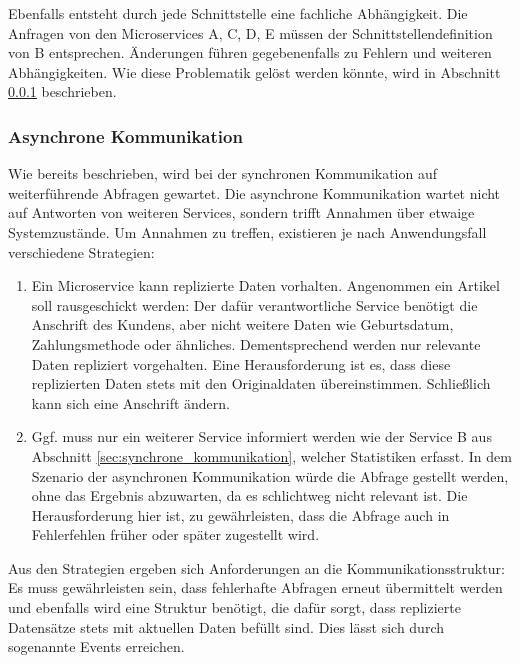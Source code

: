 Ebenfalls entsteht durch jede Schnittstelle eine fachliche Abhängigkeit.\cite{bruce2019mic_in_action} Die Anfragen von den Microservices A, C, D, E müssen der Schnittstellendefinition von B entsprechen. Änderungen führen gegebenenfalls zu Fehlern und weiteren Abhängigkeiten. Wie diese Problematik gelöst werden könnte, wird in Abschnitt \ref{sec:asynchrone_kommunikation} beschrieben.

\subsubsection{Asynchrone Kommunikation}\label{sec:asynchrone_kommunikation}

Wie bereits beschrieben, wird bei der synchronen Kommunikation auf weiterführende Abfragen gewartet. Die asynchrone Kommunikation wartet nicht auf Antworten von weiteren Services, sondern trifft Annahmen über etwaige Systemzustände.\cite{wolff2018mic_praxis} Um Annahmen zu treffen, existieren je nach Anwendungsfall verschiedene Strategien:

\begin{enumerate}
\item{ Ein Microservice kann replizierte Daten vorhalten. Angenommen ein Artikel soll rausgeschickt werden: Der dafür verantwortliche Service benötigt die Anschrift des Kundens, aber nicht weitere Daten wie Geburtsdatum, Zahlungsmethode oder ähnliches. Dementsprechend werden nur relevante Daten repliziert vorgehalten. Eine Herausforderung ist es, dass diese replizierten Daten stets mit den Originaldaten übereinstimmen. Schließlich kann sich eine Anschrift ändern.\cite{wolff2018mic_praxis}}

\item{Ggf. muss nur ein weiterer Service informiert werden wie der Service B aus Abschnitt \ref{sec:synchrone_kommunikation}, welcher Statistiken erfasst. In dem Szenario der asynchronen Kommunikation würde die Abfrage gestellt werden, ohne das Ergebnis abzuwarten, da es schlichtweg nicht relevant ist. Die Herausforderung hier ist, zu gewährleisten, dass die Abfrage auch in Fehlerfehlen früher oder später zugestellt wird.}
\end{enumerate}

Aus den Strategien ergeben sich Anforderungen an die Kommunikationsstruktur: Es muss gewährleisten sein, dass fehlerhafte Abfragen erneut übermittelt werden und ebenfalls wird eine Struktur benötigt, die dafür sorgt, dass replizierte Datensätze stets mit aktuellen Daten befüllt sind. Dies lässt sich durch sogenannte Events erreichen.\cite{bruce2019mic_in_action}\cite{wolff2018mic_praxis}  \\

